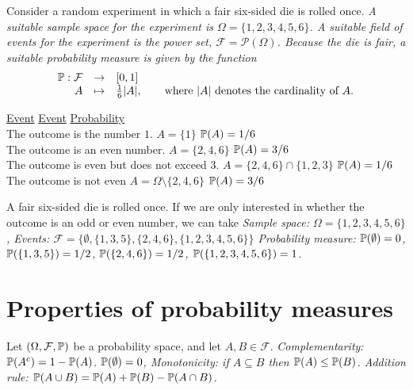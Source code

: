 \begin{example}
Consider a random experiment in which a fair six-sided die is rolled once.
\bit
\it A suitable sample space for the experiment is $\Omega=\{1,2,3,4,5,6\}$.
\it A suitable field of events for the experiment is the power set, $\mathcal{F} = \mathcal{P}(\Omega)$.
\it Because the die is fair, a suitable probability measure is given by the function
\[\begin{array}{rcl}
\mathbb{P}:	\mathcal{F} & \to 		& [0,1] \\
		A			& \mapsto 	& \frac{1}{6}|A|, \qquad\text{where $|A|$ denotes the cardinality of $A$.}

\end{array}\] 
\eit

\begin{tabbing}
\underline{Event}\qquad\qquad\qquad\qquad\qquad\qquad\qquad\qquad\qquad
	\=\underline{Event}\qquad\qquad\qquad\qquad\qquad
	\=\underline{Probability} \\
The outcome is the number $1$.	\> $A = \{1\}$ \> $\mathbb{P}(A) = 1/6$\\
The outcome is an even number.	\> $A = \{2,4,6\}$  \> $\mathbb{P}(A) = 3/6$\\
The outcome is even but does not exceed $3$.	\> $A = \{2,4,6\}\cap\{1,2,3\}$  \> $\mathbb{P}(A) = 1/6$\\
The outcome is not even			\> $A = \Omega\setminus\{2,4,6\}$ \> $\mathbb{P}(A) = 3/6$
\end{tabbing}
\end{example}

\begin{example}
A fair six-sided die is rolled once. If we are only interested in whether the outcome is an odd or even number, we can take
\bit
\it Sample space: $\Omega=\{1,2,3,4,5,6\}$,
\it Events: $\mathcal{F} = \big\{\emptyset,\{1,3,5\},\{2,4,6\},\{1,2,3,4,5,6\}\big\}$
\it Probability measure: $\mathbb{P}(\emptyset)=0$, $\mathbb{P}(\{1,3,5\})=1/2$, $\mathbb{P}(\{2,4,6\})=1/2$, $\mathbb{P}(\{1,2,3,4,5,6\})=1$.
\eit
\end{example}

\section{Properties of probability measures}

\begin{theorem}\label{thm:properties_of_probability_measures}
Let $(\Omega,\mathcal{F},\mathbb{P})$ be a probability space, and let $A,B\in\mathcal{F}$. 
\ben
\it Complementarity: $\mathbb{P}(A^c) = 1 - \mathbb{P}(A)$.
\it $\mathbb{P}(\emptyset) = 0$,
\it Monotonicity: if $A\subseteq B$ then $\mathbb{P}(A)\leq \mathbb{P}(B)$.
\it Addition rule: $\mathbb{P}(A\cup B) = \mathbb{P}(A) + \mathbb{P}(B) - \mathbb{P}(A\cap B)$.
\een
\end{theorem}

